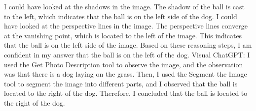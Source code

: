 \begin{enumerate}
        I could have looked at the shadows in the image. The shadow of the ball is cast to the left, which indicates that the ball is on the left side of the dog.
        I could have looked at the perspective lines in the image. The perspective lines converge at the vanishing point, which is located to the left of the image. This indicates that the ball is on the left side of the image.
        Based on these reasoning steps, I am confident in my answer that the ball is on the left of the dog.
        \subitem Visual ChatGPT: I used the Get Photo Description tool to observe the image, and the observation was that there is a dog laying on the grass. Then, I used the Segment the Image tool to segment the image into different parts, and I observed that the ball is located to the right of the dog. Therefore, I concluded that the ball is located to the right of the dog.
    \end{enumerate}

